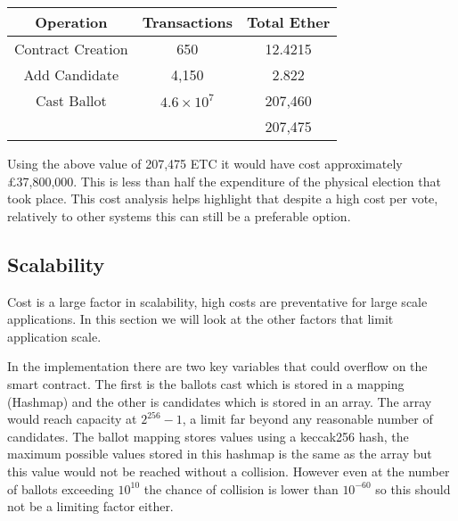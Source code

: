 \documentclass{entcs}
\begin{document}
\begin{table}[h!]
\centering
\begin{tabular}{|c c c|}
 \hline
 Operation & Transactions & Total Ether \\ 
 \hline
 Contract Creation & 650 & 12.4215\\  
 Add Candidate & 4,150 & 2.822\\  
 Cast Ballot & \(4.6 \times 10^7\) & 207,460 \\  
 \hline
  & & 207,475 \\
 \hline
\end{tabular}
\end{table}

Using the above value of 207,475 ETC it would have cost approximately \pounds37,800,000. This is less than half the expenditure of the physical election that took place. This cost analysis helps highlight that despite a high cost per vote, relatively to other systems this can still be a preferable option.

\subsection{Scalability} \label{sec: scalability}
Cost is a large factor in scalability, high costs are preventative for large scale applications. In this section we will look at the other factors that limit application scale.

In the implementation there are two key variables that could overflow on the smart contract. The first is the ballots cast which is stored in a mapping (Hashmap) and the other is candidates which is stored in an array. The array would reach capacity at \(2^{256} -1 \), a limit far beyond any reasonable number of candidates. The ballot mapping stores values using a keccak256 hash, the maximum possible values stored in this hashmap is the same as the array but this value would not be reached without a collision. However even at the number of ballots exceeding \(10^{10}\) the chance of collision is lower than \(10^{-60}\) so this should not be a limiting factor either.
\end{document}
